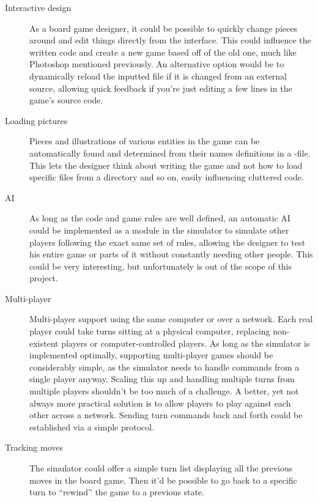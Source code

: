 \begin{description}

  \item[Interactive design] As a board game designer, it could be possible to quickly change pieces around and edit things directly from the interface. This could influence the written code and create a new game based off of the old one, much like Photoshop mentioned previously. An alternative option would be to dynamically reload the inputted file if it is changed from an external source, allowing quick feedback if you're just editing a few lines in the game's source code.

  \item[Loading pictures] Pieces and illustrations of various entities in the game can be automatically found and determined from their names definitions in a \productname{}-file. This lets the designer think about writing the game and not how to load specific files from a directory and so on, easily influencing cluttered code.

  \item[AI] As long as the code and game rules are well defined, an automatic AI could be implemented as a module in the simulator to simulate other players following the exact same set of rules, allowing the designer to test his entire game or parts of it without constantly needing other people. This could be very interesting, but unfortunately is out of the scope of this project.

  \item[Multi-player] Multi-player support using the same computer or over a network. Each real player could take turns sitting at a physical computer, replacing non-existent players or computer-controlled players. As long as the simulator is implemented optimally, supporting multi-player games should be considerably simple, as the simulator needs to handle commands from a single player anyway. Scaling this up and handling multiple turns from multiple players shouldn't be too much of a challenge. A better, yet not always more practical solution is to allow players to play against each other across a network. Sending turn commands back and forth could be established via a simple protocol.

  \item[Tracking moves] The simulator could offer a simple turn list displaying all the previous moves in the board game. Then it'd be possible to go back to a specific turn to ``rewind'' the game to a previous state.
\end{description}

